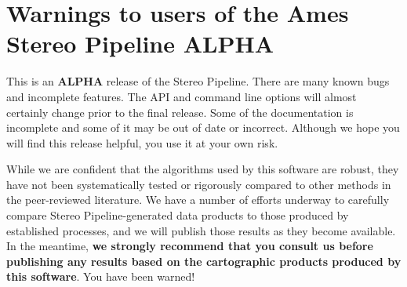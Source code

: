 \section{Warnings to users of the Ames Stereo Pipeline ALPHA}

This is an {\bf ALPHA} release of the Stereo Pipeline.  There are many
known bugs and incomplete features. The API and command line options
will almost certainly change prior to the final release.  Some of the
documentation is incomplete and some of it may be out of date or
incorrect.  Although we hope you will find this release helpful, you
use it at your own risk.

While we are confident that the algorithms used by this software are
robust, they have not been systematically tested or rigorously
compared to other methods in the peer-reviewed literature. We have a
number of efforts underway to carefully compare Stereo
Pipeline-generated data products to those produced by established
processes, and we will publish those results as they become available.
In the meantime, {\bf we strongly recommend that you consult us before
  publishing any results based on the cartographic products produced
  by this software}. You have been warned!



